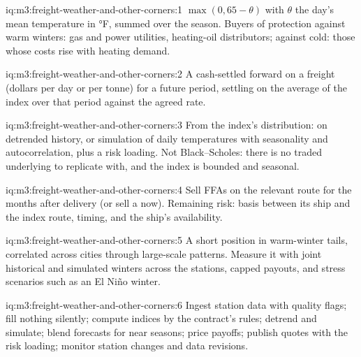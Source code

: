 \begin{solution}{iq:m3:freight-weather-and-other-corners:1}
$\max(0, 65 - \theta)$ with $\theta$ the day's mean temperature in °F, summed over the season. Buyers of
protection against warm winters: gas and power utilities, heating-oil distributors; against cold: those whose
costs rise with heating demand.
\end{solution}

\begin{solution}{iq:m3:freight-weather-and-other-corners:2}
A cash-settled forward on a freight  (dollars per day or per tonne) for a future period, settling
on the average of the index over that period against the agreed rate.
\end{solution}

\begin{solution}{iq:m3:freight-weather-and-other-corners:3}
From the index's distribution:  on detrended history, or simulation of daily temperatures with
seasonality and autocorrelation, plus a risk loading. Not Black--Scholes: there is no traded underlying to
replicate with, and the index is bounded and seasonal.
\end{solution}

\begin{solution}{iq:m3:freight-weather-and-other-corners:4}
Sell FFAs on the relevant route for the months after delivery (or sell a  now). Remaining risk:
basis between its ship and the index route, timing, and the ship's availability.
\end{solution}

\begin{solution}{iq:m3:freight-weather-and-other-corners:5}
A short position in warm-winter tails, correlated across cities through large-scale patterns. Measure it with
joint historical and simulated winters across the stations, capped payouts, and stress scenarios such as an
El Niño winter.
\end{solution}

\begin{solution}{iq:m3:freight-weather-and-other-corners:6}
Ingest station data with quality flags; fill nothing silently; compute indices by the contract's rules;
detrend and simulate; blend forecasts for near seasons; price payoffs; publish quotes with the risk loading;
monitor station changes and data revisions.
\end{solution}
